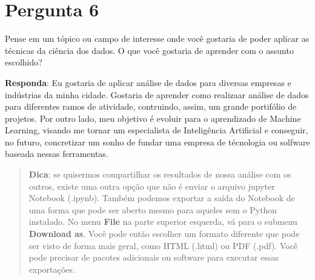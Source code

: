 \documentclass[11pt]{article}
\begin{document}
    \section{Pergunta 6}\label{pergunta-6}

Pense em um tópico ou campo de interesse onde você gostaria de poder
aplicar as técnicas da ciência dos dados. O que você gostaria de
aprender com o assunto escolhido?

\textbf{Responda}: Eu gostaria de aplicar análise de dados para diversas
empresas e indústrias da minha cidade. Gostaria de aprender como
realizaar análise de dados para diferentes ramos de atividade,
contruindo, assim, um grande portifólio de projetos. Por outro lado, meu
objetivo é evoluir para o aprendizado de Machine Learning, visando me
tornar um especialista de Inteligência Artificial e conseguir, no
futuro, concretizar um sonho de fundar uma empresa de técnologia ou
solfware baseada nessas ferramentas.

    \begin{quote}
\textbf{Dica}: se quisermos compartilhar os resultados de nossa análise
com os outros, existe uma outra opção que não é enviar o arquivo jupyter
Notebook (.ipynb). Também podemos exportar a saída do Notebook de uma
forma que pode ser aberto mesmo para aqueles sem o Python instalado. No
menu \textbf{File} na parte superior esquerda, vá para o submenu
\textbf{Download as}. Você pode então escolher um formato diferente que
pode ser visto de forma mais geral, como HTML (.html) ou PDF (.pdf).
Você pode precisar de pacotes adicionais ou software para executar essas
exportações.
\end{quote}


    
    
    
    
\end{document}
